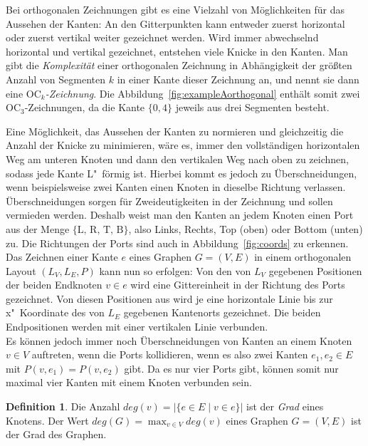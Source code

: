 \documentclass[a4paper]{scrreprt}
\theoremstyle{definition}
\newtheorem{definition}[satz]{Definition}
\begin{document}
Bei orthogonalen Zeichnungen gibt es eine Vielzahl von Möglichkeiten für das Aussehen der Kanten: An den Gitterpunkten kann entweder zuerst horizontal oder zuerst vertikal weiter gezeichnet werden. Wird immer abwechselnd horizontal und vertikal gezeichnet, entstehen viele Knicke in den Kanten. Man gibt die \emph{Komplexität} einer orthogonalen Zeichnung in Abhängigkeit der größten Anzahl von Segmenten $k$ in einer Kante dieser Zeichnung an, und nennt sie dann eine \emph{$\text{OC}_k$-Zeichnung}. Die Abbildung~\ref{fig:exampleAorthogonal} enthält somit zwei OC$_3$-Zeichnungen, da die Kante $\{0,4\}$ jeweils aus drei Segmenten besteht.

Eine Möglichkeit, das Aussehen der Kanten zu normieren und gleichzeitig die Anzahl der Knicke zu minimieren, wäre es, immer den vollständigen horizontalen Weg am unteren Knoten und dann den vertikalen Weg nach oben zu zeichnen, sodass jede Kante L"~förmig ist. Hierbei kommt es jedoch zu Überschneidungen, wenn beispielsweise zwei Kanten einen Knoten in dieselbe Richtung verlassen. Überschneidungen sorgen für Zweideutigkeiten in der Zeichnung und sollen vermieden werden. Deshalb weist man den Kanten an jedem Knoten einen Port aus der Menge $\{\text{L, R, T, B}\}$, also Links, Rechts, Top (oben) oder Bottom (unten) zu. Die Richtungen der Ports sind auch in Abbildung~\ref{fig:coords} zu erkennen.\\


Das Zeichnen einer Kante $e$ eines Graphen $G = (V,E)$ in einem orthogonalen Layout $(L_V,L_E,P)$ kann nun so erfolgen: Von den von $L_V$ gegebenen Positionen der beiden Endknoten $v \in e$ wird eine Gittereinheit in der Richtung des Ports gezeichnet. Von diesen Positionen aus wird je eine horizontale Linie bis zur x"~Koordinate des von $L_E$ gegebenen Kantenorts gezeichnet. Die beiden Endpositionen werden mit einer vertikalen Linie verbunden.\\ %


Es können jedoch immer noch Überschneidungen von Kanten an einem Knoten $v \in V$ auftreten, wenn die Ports kollidieren, wenn es also zwei Kanten $e_1, e_2 \in E$ mit $P(v, e_1) = P(v, e_2)$ gibt. Da es nur vier Ports gibt, können somit nur maximal vier Kanten mit einem Knoten verbunden sein.

\begin{definition}
  Die Anzahl $deg(v) = |\{e \in E \mid v \in e\}|$ ist der \emph{Grad} eines Knotens. Der Wert $deg(G) = \max_{v \in V}{deg(v)}$ eines Graphen $G = (V, E)$ ist der Grad des Graphen.
\end{definition}
\end{document}
